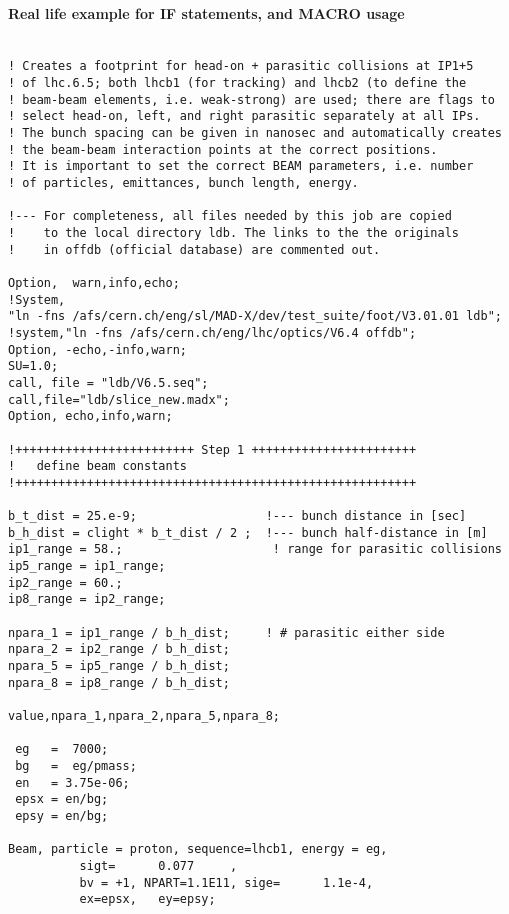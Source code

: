 
\paragraph{Real life example for IF statements, and MACRO usage}


\begin{verbatim}

! Creates a footprint for head-on + parasitic collisions at IP1+5 
! of lhc.6.5; both lhcb1 (for tracking) and lhcb2 (to define the
! beam-beam elements, i.e. weak-strong) are used; there are flags to
! select head-on, left, and right parasitic separately at all IPs.
! The bunch spacing can be given in nanosec and automatically creates
! the beam-beam interaction points at the correct positions.
! It is important to set the correct BEAM parameters, i.e. number
! of particles, emittances, bunch length, energy.

!--- For completeness, all files needed by this job are copied
!    to the local directory ldb. The links to the the originals
!    in offdb (official database) are commented out.

Option,  warn,info,echo;
!System,
"ln -fns /afs/cern.ch/eng/sl/MAD-X/dev/test_suite/foot/V3.01.01 ldb";
!system,"ln -fns /afs/cern.ch/eng/lhc/optics/V6.4 offdb";
Option, -echo,-info,warn;
SU=1.0;
call, file = "ldb/V6.5.seq";
call,file="ldb/slice_new.madx";
Option, echo,info,warn;

!+++++++++++++++++++++++++ Step 1 +++++++++++++++++++++++
! 	define beam constants
!++++++++++++++++++++++++++++++++++++++++++++++++++++++++

b_t_dist = 25.e-9;                  !--- bunch distance in [sec]
b_h_dist = clight * b_t_dist / 2 ;  !--- bunch half-distance in [m]
ip1_range = 58.;                     ! range for parasitic collisions
ip5_range = ip1_range;
ip2_range = 60.;
ip8_range = ip2_range;

npara_1 = ip1_range / b_h_dist;     ! # parasitic either side
npara_2 = ip2_range / b_h_dist;
npara_5 = ip5_range / b_h_dist;
npara_8 = ip8_range / b_h_dist;

value,npara_1,npara_2,npara_5,npara_8;

 eg   =  7000;
 bg   =  eg/pmass;
 en   = 3.75e-06;
 epsx = en/bg;
 epsy = en/bg;

Beam, particle = proton, sequence=lhcb1, energy = eg,
          sigt=      0.077     , 
          bv = +1, NPART=1.1E11, sige=      1.1e-4, 
          ex=epsx,   ey=epsy;


\end{verbatim}
